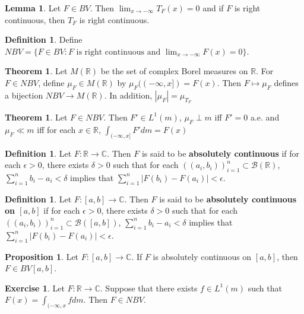 \documentclass[12pt]{amsart}
\theoremstyle{definition}
\newtheorem{defn}[definition]{Definition}
\newtheorem{thm}[definition]{Theorem}
\newtheorem{lem}[definition]{Lemma}
\newtheorem{prop}[definition]{Proposition}
\newtheorem{ex}[definition]{Exercise}
\newcommand{\del}{\delta}
\newcommand{\ep}{\epsilon}
\newcommand{\C}{\mathbb{C}}
\newcommand{\R}{\mathbb{R}}
\newcommand{\MB}{\mathcal{B}}
\begin{document}
	\begin{lem}
		Let $F \in BV$. Then $\lim_{x \rightarrow -\infty}T_F(x)=0$ and if $F$ is right continuous, then $T_F$ is right continuous.
	\end{lem}
	
	\begin{defn}
		Define $NBV=\{F \in BV: F \text{ is right continuous and }\lim_{x \rightarrow -\infty}F(x)=0\}$.
	\end{defn}
	
	\begin{thm}
		Let $M(\R)$ be the set of complex Borel measures on $\R$. For $F \in NBV$, define $\mu_F \in M(\R)$ by $\mu_F((-\infty, x]) = F(x)$. Then $F \mapsto \mu_F$ defines a bijection $NBV \rightarrow M(\R)$. In addition, $|\mu_F| = \mu_{T_F}$
	\end{thm}
	
	\begin{thm}
		Let $F \in NBV$. Then $F' \in L^1(m)$, $\mu_F \perp m$ iff $F' =0$ a.e. and $\mu_F \ll m$ iff for each $x \in \R$, $\int_{(-\infty, x]}F'dm = F(x)$
	\end{thm}
	
	\begin{defn}
		Let $F: \R \rightarrow \C$. Then $F$ is said to be \textbf{absolutely continuous} if for each $\ep>0$, there exists $\del>0$ such that for each $((a_i, b_i))_{i=1}^n \subset \MB(\R)$, $\sum_{i=1}^n b_i-a_i < \del$ implies that $\sum_{i=1}^n|F(b_i)-F(a_i)| < \ep$.
	\end{defn}
	
	\begin{defn}
		Let $F: [a,b] \rightarrow \C$. Then $F$ is said to be \textbf{absolutely continuous on $[a,b]$} if for each $\ep>0$, there exists $\del>0$ such that for each $((a_i, b_i))_{i=1}^n \subset \MB([a,b])$, $\sum_{i=1}^n b_i-a_i < \del$ implies that $\sum_{i=1}^n|F(b_i)-F(a_i)| < \ep$.
	\end{defn}
	
	\begin{prop}
		Let $F:[a,b] \rightarrow \C$. If $F$ is absolutely continuous on $[a,b]$, then $F \in BV[a,b]$.
	\end{prop}
	
	\begin{ex}
		Let $F: \R \rightarrow \C$. Suppose that there exists $f \in L^1(m)$ such that $F(x) = \int_{(-\infty, x}fdm$. Then $F \in NBV$.
	\end{ex}
	
\end{document}
